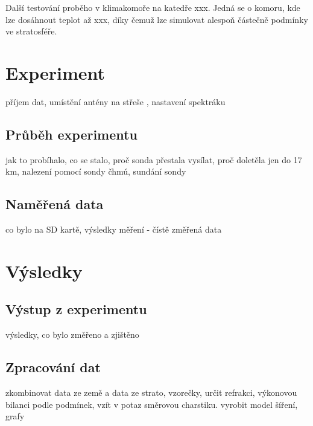 \documentclass[twoside]{ctuthesis}
\theoremstyle{plain}
\theoremstyle{definition}
\theoremstyle{note}
\begin{document}
	Další testování proběho v klimakomoře na katedře xxx. Jedná se o komoru, kde lze dosáhnout teplot až xxx, díky čemuž lze simulovat alespoň částečně podmínky ve stratosféře.


	

	
















	

\chapter{Experiment}
	příjem dat, umístění antény na střeše , nastavení spektráku
	\section{Průběh experimentu}
	jak to probíhalo, co se stalo, proč sonda přestala vysílat, proč doletěla jen do 17 km, nalezení pomocí sondy čhmú, sundání sondy

	\section{Naměřená data}
	co bylo na SD kartě, výsledky měření - čístě změřená data



\chapter{Výsledky}
	\section{Výstup z experimentu}
	výsledky, co bylo změřeno a zjištěno

	\section{Zpracování dat}
	zkombinovat data ze země a data ze strato, vzorečky, určit refrakci, výkonovou bilanci podle podmínek, vzít v potaz směrovou charstiku. vyrobit model šíření, grafy

	
	
\end{document}
